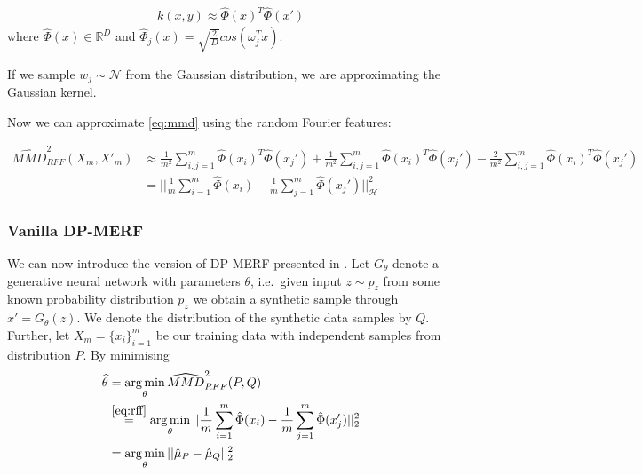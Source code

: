 \begin{align}
    k(x,y) \approx \hat{\Phi}(x)^T \hat{\Phi}(x')
\end{align}
where $\hat{\Phi}(x) \in \mathbb{R}^D$ and $\hat{\Phi}_j(x) = \sqrt{\frac{2}{D}} cos (\omega_j^T x)$.

If we sample $w_j \sim \mathcal{N}$ from the Gaussian distribution, we are approximating the Gaussian kernel.

Now we can approximate \cref{eq:mmd} using the random Fourier features:

\begin{align} \label{eq:rff}
    \widehat{MMD}^2_{RFF}(X_m, X'_m) &\approx \frac{1}{m^2} \sum_{i,j=1}^m \hat{\Phi}(x_i)^T \hat{\Phi}(x_j') + \frac{1}{m^2} \sum_{i,j=1}^m \hat{\Phi}(x_i)^T \hat{\Phi}(x_j') - \frac{2}{m^2} \sum_{i,j=1}^m \hat{\Phi}(x_i)^T \hat{\Phi}(x_j') \nonumber \\
    &= || \frac{1}{m} \sum_{i=1}^m \hat{\Phi}(x_i) - \frac{1}{m} \sum_{j=1}^m \hat{\Phi}(x_j') ||_\mathcal{H}^2
\end{align}


\subsubsection{Vanilla DP-MERF}
We can now introduce the version of DP-MERF presented in \parencite{dpmerf}. Let $G_\theta$ denote a generative neural network with parameters $\theta$, i.e.\ given input $z \sim p_z$ from some known probability distribution $p_z$ we obtain a synthetic sample through $x' = G_\theta(z)$. We denote the distribution of the synthetic data samples by $Q$. Further, let $X_m = \{x_i\}_{i=1}^m$ be our training data with independent samples from  distribution $P$. By minimising 
\begin{align}
    \widehat{\theta} &= \operatorname*{arg\,min}_\theta \widehat{MMD}^2_{RFF}(P, Q) \nonumber \\
    &\overset{\ref{eq:rff}}{=} \operatorname*{arg\,min}_\theta || \frac{1}{m} \sum_{i=1}^m \hat{\Phi}(x_i) - \frac{1}{m} \sum_{j=1}^m \hat{\Phi}(x_j') ||_2^2 \nonumber \\
    &= \operatorname*{arg\,min}_\theta || \hat{\mu}_P - \hat{\mu}_Q ||_2^2
\end{align}

